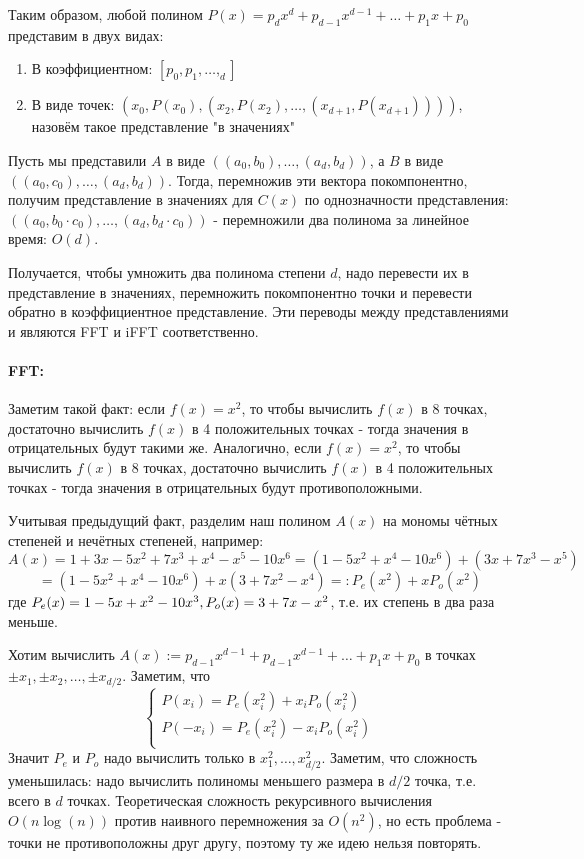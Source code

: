 \documentclass{article}
\begin{document}
  Таким образом, любой полином $P(x)=p_dx^d+p_{d-1}x^{d-1}+\dots+p_1x+p_0$ представим в двух видах:
  \begin{enumerate}
    \item В коэффициентном: $[p_0,p_1,\dots,_d]$
    \item В виде точек: $(x_0, P(x_0), (x_2,P(x_2),\dots , (x_{d+1},P(x_{d+1}))))$, назовём такое представление "в значениях"
  \end{enumerate}

  Пусть мы представили $A$ в виде $((a_0,b_0),\dots,(a_d,b_d))$, а $B$ в виде $((a_0,c_0),\dots,(a_d,b_d))$. Тогда, перемножив эти вектора покомпонентно, получим представление в значениях для $C(x)$ по однозначности представления: $((a_0,b_0\cdot c_0),\dots,(a_d,b_d\cdot c_0))$ - перемножили два полинома за линейное время: $O(d)$.

  Получается, чтобы умножить два полинома степени $d$, надо перевести их в представление в значениях, перемножить покомпонентно точки и перевести обратно в коэффициентное представление. Эти переводы между представлениями и являются FFT и iFFT соответственно.
  \paragraph{FFT:}
  Заметим такой факт: если $f(x)=x^2$, то чтобы вычислить $f(x)$ в 8 точках, достаточно вычислить $f(x)$ в 4 положительных точках - тогда значения в отрицательных будут такими же. Аналогично, если $f(x)=x^2$, то чтобы вычислить $f(x)$ в 8 точках, достаточно вычислить $f(x)$ в 4 положительных точках - тогда значения в отрицательных будут противоположными.

  Учитывая предыдущий факт, разделим наш полином $A(x)$ на мономы чётных степеней и нечётных степеней, например:
  \[A(x)=1+3x-5x^2+7x^3+x^4-x^5-10x^6 =(1 - 5x^2 + x^4 - 10x^6) + (3x + 7x^3 - x^5)\]
  \[= (1 - 5x^2 + x^4 - 10x^6) + x(3 + 7x^2 - x^4)=: P_e(x^2) + xP_o(x^2)\]
  где $P_e(x)=1-5x+x^2-10x^3,\q P_o(x)=3+7x-x^2$, т.е. их степень в два раза меньше.

  Хотим вычислить $A(x) := p_{d-1}x^{d-1}+p_{d-1}x^{d-1}+\dots+p_1x+p_0$ в точках $\pm x_1,\pm x_2,\dots, \pm x_{d/2}$. Заметим, что
  \[\begin{cases}
    P(x_i) = P_e(x_i^2) + x_iP_o(x_i^2)\\
    P(-x_i) = P_e(x_i^2) - x_iP_o(x_i^2)\\
  \end{cases}\]
  Значит $P_e$ и $P_o$ надо вычислить только в $x_1^2,\dots,x_{d/2}^2$. Заметим, что сложность уменьшилась: надо вычислить полиномы меньшего размера в $d/2$ точка, т.е. всего в $d$ точках. Теоретическая сложность рекурсивного вычисления $O(n\log(n))$ против наивного перемножения за $O(n^2)$, но есть проблема - точки не противоположны друг другу, поэтому ту же идею нельзя повторять.
\end{document}
